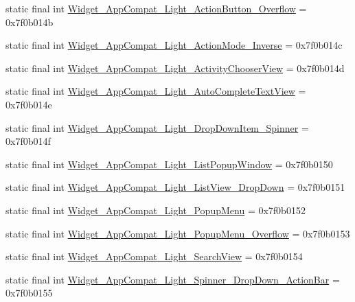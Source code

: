 \begin{CompactItemize}
\item 
static final int \hyperlink{classandroid_1_1support_1_1graphics_1_1drawable_1_1animated_1_1_r_1_1style_059cfff045daa9956028a60b1c82d2b7}{Widget\_\-AppCompat\_\-Light\_\-ActionButton\_\-Overflow} = 0x7f0b014b
\item 
static final int \hyperlink{classandroid_1_1support_1_1graphics_1_1drawable_1_1animated_1_1_r_1_1style_e209bde07ea658659ec9d30c8f63b169}{Widget\_\-AppCompat\_\-Light\_\-ActionMode\_\-Inverse} = 0x7f0b014c
\item 
static final int \hyperlink{classandroid_1_1support_1_1graphics_1_1drawable_1_1animated_1_1_r_1_1style_3ae13ac37cde7cd47390ed09e7b9ac1c}{Widget\_\-AppCompat\_\-Light\_\-ActivityChooserView} = 0x7f0b014d
\item 
static final int \hyperlink{classandroid_1_1support_1_1graphics_1_1drawable_1_1animated_1_1_r_1_1style_f34968be7d50fdebbe77274013295e30}{Widget\_\-AppCompat\_\-Light\_\-AutoCompleteTextView} = 0x7f0b014e
\item 
static final int \hyperlink{classandroid_1_1support_1_1graphics_1_1drawable_1_1animated_1_1_r_1_1style_392c89e2dc73d0ec2d63e0939a0f15db}{Widget\_\-AppCompat\_\-Light\_\-DropDownItem\_\-Spinner} = 0x7f0b014f
\item 
static final int \hyperlink{classandroid_1_1support_1_1graphics_1_1drawable_1_1animated_1_1_r_1_1style_2ef15d3022c0631a4f0528e52f7bdeaa}{Widget\_\-AppCompat\_\-Light\_\-ListPopupWindow} = 0x7f0b0150
\item 
static final int \hyperlink{classandroid_1_1support_1_1graphics_1_1drawable_1_1animated_1_1_r_1_1style_3611f70cbe707c9a453978ca280d9904}{Widget\_\-AppCompat\_\-Light\_\-ListView\_\-DropDown} = 0x7f0b0151
\item 
static final int \hyperlink{classandroid_1_1support_1_1graphics_1_1drawable_1_1animated_1_1_r_1_1style_eb5c1e0d377119b0cb236d56efaaed65}{Widget\_\-AppCompat\_\-Light\_\-PopupMenu} = 0x7f0b0152
\item 
static final int \hyperlink{classandroid_1_1support_1_1graphics_1_1drawable_1_1animated_1_1_r_1_1style_47f07beaa5ec5ebfceb920d394e6d94c}{Widget\_\-AppCompat\_\-Light\_\-PopupMenu\_\-Overflow} = 0x7f0b0153
\item 
static final int \hyperlink{classandroid_1_1support_1_1graphics_1_1drawable_1_1animated_1_1_r_1_1style_5b1196f98a22372fd7e7d2d96bc8f9f7}{Widget\_\-AppCompat\_\-Light\_\-SearchView} = 0x7f0b0154
\item 
static final int \hyperlink{classandroid_1_1support_1_1graphics_1_1drawable_1_1animated_1_1_r_1_1style_66e40ea96041291b0c173adb4146e4d4}{Widget\_\-AppCompat\_\-Light\_\-Spinner\_\-DropDown\_\-ActionBar} = 0x7f0b0155

\end{CompactItemize}
